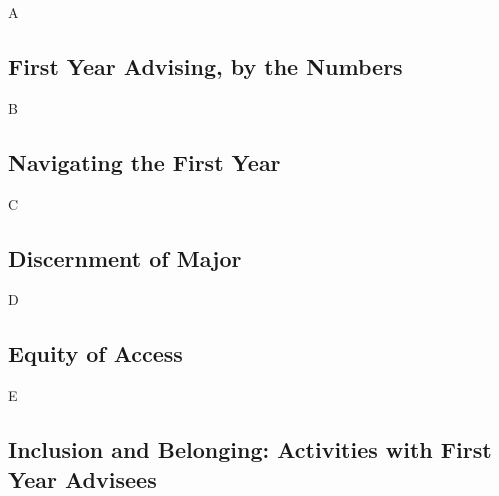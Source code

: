 \documentclass[../../../main.tex]{subfiles}
\begin{document}
A

\subsection{First Year Advising, by the Numbers}

B

\subsection{Navigating the First Year}

C

\subsection{Discernment of Major}

D

\subsection{Equity of Access}

E

\subsection{Inclusion and Belonging: Activities with First Year Advisees}
\end{document}
